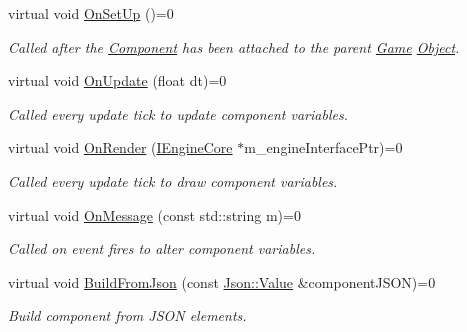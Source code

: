 \begin{DoxyCompactItemize}
\item 
\mbox{\label{class_component_a27f86131a87b858143069631fade78fb}} 
virtual void \mbox{\hyperlink{class_component_a27f86131a87b858143069631fade78fb}{On\+Set\+Up}} ()=0
\begin{DoxyCompactList}\small\item\em Called after the \mbox{\hyperlink{class_component}{Component}} has been attached to the parent \mbox{\hyperlink{class_game}{Game}} \mbox{\hyperlink{class_object}{Object}}. \end{DoxyCompactList}\item 
\mbox{\label{class_component_ab71d7f4b6d8792287a9b0c9e045acbe0}} 
virtual void \mbox{\hyperlink{class_component_ab71d7f4b6d8792287a9b0c9e045acbe0}{On\+Update}} (float dt)=0
\begin{DoxyCompactList}\small\item\em Called every update tick to update component variables. \end{DoxyCompactList}\item 
\mbox{\label{class_component_aa9f90c2587b0c1182d804f4e256d97df}} 
virtual void \mbox{\hyperlink{class_component_aa9f90c2587b0c1182d804f4e256d97df}{On\+Render}} (\mbox{\hyperlink{class_i_engine_core}{I\+Engine\+Core}} $\ast$m\+\_\+engine\+Interface\+Ptr)=0
\begin{DoxyCompactList}\small\item\em Called every update tick to draw component variables. \end{DoxyCompactList}\item 
\mbox{\label{class_component_a1a880fe5e212cd7ef8241e220660417d}} 
virtual void \mbox{\hyperlink{class_component_a1a880fe5e212cd7ef8241e220660417d}{On\+Message}} (const std\+::string m)=0
\begin{DoxyCompactList}\small\item\em Called on event fires to alter component variables. \end{DoxyCompactList}\item 
\mbox{\label{class_component_acd902c5b6b2f3e991966a3ec9c5196b0}} 
virtual void \mbox{\hyperlink{class_component_acd902c5b6b2f3e991966a3ec9c5196b0}{Build\+From\+Json}} (const \mbox{\hyperlink{class_json_1_1_value}{Json\+::\+Value}} \&component\+J\+S\+ON)=0
\begin{DoxyCompactList}\small\item\em Build component from J\+S\+ON elements. \end{DoxyCompactList}\end{DoxyCompactItemize}
